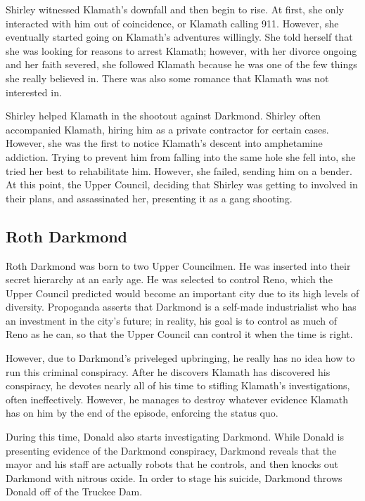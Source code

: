 \documentclass{article}
\begin{document}
Shirley witnessed Klamath's downfall and then begin to rise. At first, she only interacted with him out of coincidence, or Klamath calling 911. However, she eventually started going on Klamath's adventures willingly. She told herself that she was looking for reasons to arrest Klamath; however, with her divorce ongoing and her faith severed, she followed Klamath because he was one of the few things she really believed in. There was also some romance that Klamath was not interested in.

Shirley helped Klamath in the shootout against Darkmond. Shirley often accompanied Klamath, hiring him as a private contractor for certain cases. However, she was the first to notice Klamath's descent into amphetamine addiction. Trying to prevent him from falling into the same hole she fell into, she tried her best to rehabilitate him. However, she failed, sending him on a bender. At this point, the Upper Council, deciding that Shirley was getting to involved in their plans, and assassinated her, presenting it as a gang shooting.

\subsection{Roth Darkmond}

Roth Darkmond was born to two Upper Councilmen. He was inserted into their secret hierarchy at an early age. He was selected to control Reno, which the Upper Council predicted would become an important city due to its high levels of diversity. Propoganda asserts that Darkmond is a self-made industrialist who has an investment in the city's future; in reality, his goal is to control as much of Reno as he can, so that the Upper Council can control it when the time is right.

However, due to Darkmond's priveleged upbringing, he really has no idea how to run this criminal conspiracy. After he discovers Klamath has discovered his conspiracy, he devotes nearly all of his time to stifling Klamath's investigations, often ineffectively. However, he manages to destroy whatever evidence Klamath has on him by the end of the episode, enforcing the status quo.

During this time, Donald also starts investigating Darkmond. While Donald is presenting evidence of the Darkmond conspiracy, Darkmond reveals that the mayor and his staff are actually robots that he controls, and then knocks out Darkmond with nitrous oxide. In order to stage his suicide, Darkmond throws Donald off of the Truckee Dam.
\end{document}
